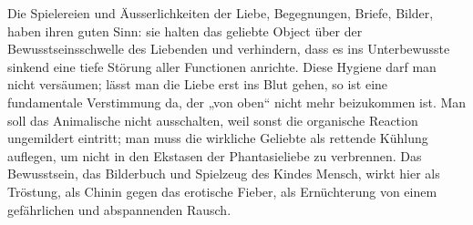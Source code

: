 Die Spielereien und Äusserlichkeiten der Liebe, Begegnungen, Briefe, Bilder, haben ihren guten Sinn: sie halten das geliebte Object über der Bewusstseinsschwelle des Liebenden und verhindern, dass es ins Unterbewusste sinkend eine tiefe Störung aller Functionen anrichte. Diese Hygiene darf man nicht versäumen; lässt man die Liebe erst ins Blut gehen, so ist eine fundamentale Verstimmung da, der „von oben“ nicht mehr beizukommen ist. Man soll das Animalische nicht ausschalten, weil sonst die organische Reaction ungemildert eintritt; man muss die wirkliche Geliebte als rettende Kühlung auflegen, um nicht in den Ekstasen der Phantasieliebe zu verbrennen. Das Bewusstsein, das Bilderbuch und Spielzeug des Kindes Mensch, wirkt hier als Tröstung, als Chinin gegen das erotische Fieber, als Ernüchterung von einem gefährlichen und abspannenden Rausch.
\par

